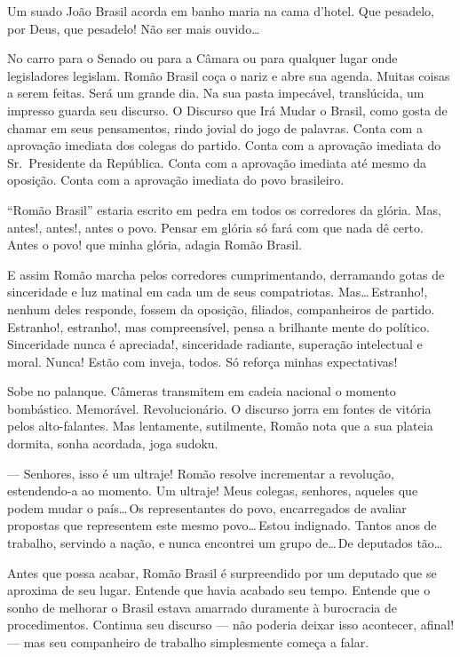 Um suado João Brasil acorda em banho maria na cama d'hotel. Que pesadelo, por Deus, que pesadelo! Não ser mais ouvido\ldots



No carro para o Senado ou para a Câmara ou para qualquer lugar onde legisladores legislam. Romão Brasil coça o nariz e abre sua agenda. Muitas coisas a serem feitas. Será um grande dia. Na sua pasta impecável, translúcida, um impresso guarda seu discurso. O Discurso que Irá Mudar o Brasil, como gosta de chamar em seus pensamentos, rindo jovial do jogo de palavras. Conta com a aprovação imediata dos colegas do partido. Conta com a aprovação imediata do Sr.~Presidente da República. Conta com a aprovação imediata até mesmo da oposição. Conta com a aprovação imediata do povo brasileiro.

``Romão Brasil'' estaria escrito em pedra em todos os corredores da glória. Mas, antes!, antes!, antes o povo. Pensar em glória só fará com que nada dê certo. Antes o povo! que minha glória, adagia Romão Brasil.

E assim Romão marcha pelos corredores cumprimentando, derramando gotas de sinceridade e luz matinal em cada um de seus compatriotas. Mas\ldots\,Estranho!, nenhum deles responde, fossem da oposição, filiados, companheiros de partido. Estranho!, estranho!, mas compreensível, pensa a brilhante mente do político. Sinceridade nunca é apreciada!, sinceridade radiante, superação intelectual e moral. Nunca! Estão com inveja, todos. Só reforça minhas expectativas!

Sobe no palanque. Câmeras transmitem em cadeia nacional o momento bombástico. Memorável. Revolucionário. O discurso jorra em fontes de vitória pelos alto-falantes. Mas lentamente, sutilmente, Romão nota que a sua plateia dormita, sonha acordada, joga sudoku.

--- Senhores, isso é um ultraje! Romão resolve incrementar a revolução, estendendo-a ao momento. Um ultraje! Meus colegas, senhores, aqueles que podem mudar o país\ldots\,Os representantes do povo, encarregados de avaliar propostas que representem este mesmo povo\ldots\,Estou indignado. Tantos anos de trabalho, servindo a nação, e nunca encontrei um grupo de\ldots\,De deputados tão\ldots

Antes que possa acabar, Romão Brasil é surpreendido por um deputado que se aproxima de seu lugar. Entende que havia acabado seu tempo. Entende que o sonho de melhorar o Brasil estava amarrado duramente à burocracia de procedimentos. Continua seu discurso --- não poderia deixar isso acontecer, afinal! --- mas seu companheiro de trabalho simplesmente começa a falar.

